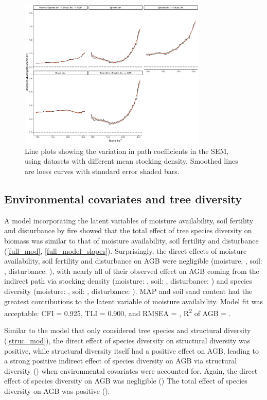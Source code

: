 \documentclass[11pt,a4paper]{article}
\begin{document}
\begin{figure}[H]
\centering
	\includegraphics[width=0.8\textwidth]{sem_struc_stems_ha}
	\caption{Line plots showing the variation in path coefficients in the SEM, using datasets with different mean stocking density. Smoothed lines are loess curves with standard error shaded bars.}
	\label{sem_struc_stems_ha}
\end{figure}

\subsection{Environmental covariates and tree diversity}

A model incorporating the latent variables of moisture availability, soil fertility and disturbance by fire showed that the total effect of tree species diversity on biomass was similar to that of moisture availability, soil fertility and disturbance (\autoref{full_mod}, \autoref{full_model_slopes}). Surprisingly, the direct effects of moisture availability, soil fertility and disturbance on AGB were negligible (moisture, \fmbetamb{}, soil: \fmbetasb{}, disturbance: \fmbetafb{}), with nearly all of their observed effect on AGB coming from the indirect path via stocking density (moisture: \fmbetamib{}, soil: \fmbetasib{}, disturbance: \fmbetafib{}) and species diversity (moisture: \fmbetamd{}, soil: \fmbetasd{}, disturbance: \fmbetafd{}). MAP and soil sand content had the greatest contributions to the latent variable of moisture availability. Model fit was acceptable: CFI = 0.925, TLI = 0.900, and RMSEA = \fmrmsea{}, R\textsuperscript{2} of AGB = \fmrsq{}.

Similar to the model that only considered tree species and structural diversity (\autoref{struc_mod}), the direct effect of species diversity on structural diversity was positive, while structural diversity itself had a positive effect on AGB, leading to a strong positive indirect effect of species diversity on AGB via structural diversity (\fmbetadhb{}) when environmental covariates were accounted for. Again, the direct effect of species diversity on AGB was negligible (\fmbetadb{}) The total effect of species diversity on AGB was positive (\fmbetatotaldb{}).
\end{document}
